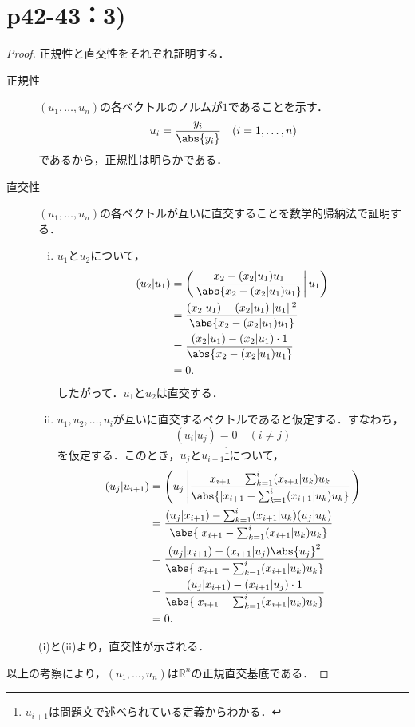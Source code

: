 \documentclass[a4paper,10pt,fleqn]{ltjsarticle}
\begin{document}
\section*{p42-43：3)}


\begin{tleftbar}
\begin{proof}
  正規性と直交性をそれぞれ証明する．
  \begin{description}
  \item[正規性] $(u_1, \ldots, u_n)$の各ベクトルのノルムが$1$であることを示す．
  \[
    u_i = \frac{y_i}{\abs{y_i}} \quad (i = 1, \ldots, n)
  \]
  であるから，正規性は明らかである．
\item[直交性] $(u_1, \ldots, u_n)$の各ベクトルが互いに直交することを数学的帰納法で証明する．
\begin{enumerate}[(i)]
    \item $u_1$と$u_2$について，
    \begin{align*}
    (u_2 | u_1) &= \left(\left. \frac{x_2 - (x_2 | u_1) u_1}{\abs{ x_2 - (x_2 | u_1) u_1 }} \right|u_1 \right) \\
    &= \frac{(x_2 | u_1) - (x_2 | u_1) \|u_1\|^2}{\abs{ x_2 - (x_2 | u_1) u_1 }} \\
    &= \frac{(x_2 | u_1) - (x_2 | u_1) \cdot 1}{\abs{ x_2 - (x_2 | u_1) u_1 }} \\
    &= 0.
    \end{align*}
    したがって．$u_1$と$u_2$は直交する．
    
    \item $u_1, u_2, \ldots, u_i$が互いに直交するベクトルであると仮定する．すなわち，
    \[
      (u_i | u_j) = 0 \quad (i \ne j)
    \]
    を仮定する．このとき，$u_j$と$u_{i+1}$\footnote{$u_{i+1}$は問題文で述べられている定義からわかる．}について，
    \begin{align*}
    (u_j | u_{i+1}) &=\left  ( u_j \left| \frac{x_{i+1} - \sum_{k=1}^{i} (x_{i+1} | u_k) u_k}{\abs{| x_{i+1} - \sum_{k=1}^{i} (x_{i+1} | u_k) u_k }} \right. \right) \\
    &= \frac{(u_j | x_{i+1}) - \sum_{k=1}^{i} (x_{i+1} | u_k) (u_j | u_k)}{\abs{| x_{i+1} - \sum_{k=1}^{i} (x_{i+1} | u_k) u_k }} \\
    &= \frac{(u_j | x_{i+1}) - (x_{i+1} | u_j) \abs{u_j}^2}{\abs{| x_{i+1} - \sum_{k=1}^{i} (x_{i+1} | u_k) u_k }} \\
    &= \frac{(u_j | x_{i+1}) - (x_{i+1} | u_j) \cdot 1}{\abs{| x_{i+1} - \sum_{k=1}^{i} (x_{i+1} | u_k) u_k }} \\
    &= 0.
    \end{align*}
\end{enumerate}
(i)と(ii)より，直交性が示される．
\end{description}
以上の考察により，$(u_1, \ldots, u_n)$は$\mathbb{R}^n$の正規直交基底である．
\end{proof}
\end{tleftbar}
\end{document}

